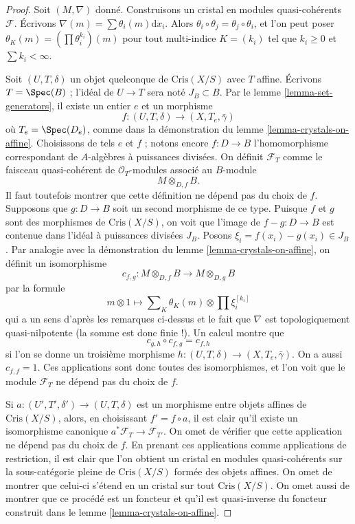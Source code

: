 \begin{proof}
Soit $(M, \nabla)$ donné. Construisons
un cristal en modules quasi-cohérents $\mathcal{F}$.
Écrivons $\nabla(m) = \sum \theta_i(m)\text{d}x_i$.
Alors $\theta_i \circ \theta_j = \theta_j \circ \theta_i$, et l'on
peut poser $\theta_K(m) = (\prod \theta_i^{k_i})(m)$ pour tout multi-indice
$K = (k_i)$ tel que $k_i \geq 0$ et $\sum k_i < \infty$.

\medskip\noindent
Soit $(U, T, \delta)$ un objet quelconque de $\text{Cris}(X/S)$ avec $T$ affine.
Écrivons $T = \Spec(B)$ ; l'idéal de $U \to T$ sera noté $J_B \subset B$.
Par le lemme \ref{lemma-set-generators}, il existe un entier $e$ et un morphisme
$$
f : (U, T, \delta) \longrightarrow (X, T_e, \bar\gamma)
$$
où $T_e = \Spec(D_e)$, comme dans la démonstration du
lemme \ref{lemma-crystals-on-affine}.
Choisissons de tels $e$ et $f$ ; notons encore $f : D \to B$ l'homomorphisme
correspondant de $A$-algèbres à puissances divisées. On définit $\mathcal{F}_T$ comme le
faisceau quasi-cohérent de $\mathcal{O}_T$-modules associé au $B$-module
$$
M \otimes_{D, f} B.
$$
Il faut toutefois montrer que cette définition ne dépend pas du choix de $f$.
Supposons que $g : D \to B$ soit un second morphisme de ce type. Puisque $f$ et $g$
sont des morphismes de $\text{Cris}(X/S)$, on voit que l'image de
$f - g : D \to B$ est contenue dans l'idéal à puissances divisées $J_B$.
Posons $\xi_i = f(x_i) - g(x_i) \in J_B$. Par analogie avec la démonstration
du lemme \ref{lemma-crystals-on-affine}, on définit un isomorphisme
$$
c_{f, g} : M \otimes_{D, f} B \longrightarrow M \otimes_{D, g} B
$$
par la formule
$$
m \otimes 1 \longmapsto 
\sum\nolimits_K \theta_K(m) \otimes \prod \xi_i^{[k_i]}
$$
qui a un sens d'après les remarques ci-dessus et le fait que $\nabla$
est topologiquement quasi-nilpotente (la somme est donc finie !).
Un calcul montre que
$$
c_{g, h} \circ c_{f, g} = c_{f, h}
$$
si l'on se donne un troisième morphisme
$h : (U, T, \delta) \longrightarrow (X, T_e, \bar\gamma)$.
On a aussi $c_{f, f} = 1$.
Ces applications sont donc toutes des isomorphismes, et l'on voit que
le module $\mathcal{F}_T$ ne dépend pas du choix de $f$.

\medskip\noindent
Si $a : (U', T', \delta') \to (U, T, \delta)$ est un morphisme entre objets affines
de $\text{Cris}(X/S)$, alors, en choisissant $f' = f \circ a$, il est clair
qu'il existe un isomorphisme canonique
$a^*\mathcal{F}_T \to \mathcal{F}_{T'}$. On omet de vérifier que cette
application ne dépend pas du choix de $f$. En prenant ces applications comme applications de restriction,
il est clair que l'on obtient un cristal en modules quasi-cohérents
sur la sous-catégorie pleine de $\text{Cris}(X/S)$ formée des objets affines.
On omet de montrer que celui-ci s'étend en un cristal sur tout
$\text{Cris}(X/S)$. On omet aussi de montrer que ce procédé est un foncteur
et qu'il est quasi-inverse du foncteur construit dans le
lemme \ref{lemma-crystals-on-affine}.
\end{proof}

